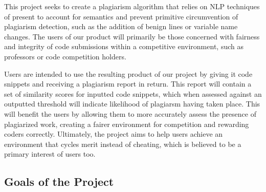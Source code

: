 \documentclass[12pt]{article}
\begin{document}
This project seeks to create a plagiarism algorithm that relies on NLP 
techniques of present to account for semantics and prevent primitive 
circumvention of plagiarism detection, such as the addition of benign lines or 
variable name changes. The users of our product will primarily be those 
concerned with fairness and integrity of code submissions within a competitive 
environment, such as professors or code competition holders. 

Users are intended to use the resulting product of our project by giving it
code snippets and receiving a plagiarism report in return. This report will
contain a set of similarity scores for inputted code snippets, which when 
assessed against an outputted threshold will indicate likelihood of plagiarsm
having taken place. This will benefit the users by allowing them to more 
accurately assess the presence of plagiarized work, creating a fairer environment
for competition and rewarding coders correctly. Ultimately, the project aims
to help users achieve an environment that cycles merit instead of cheating, 
which is believed to be a primary interest of users too.

\subsection{Goals of the Project}
\end{document}

